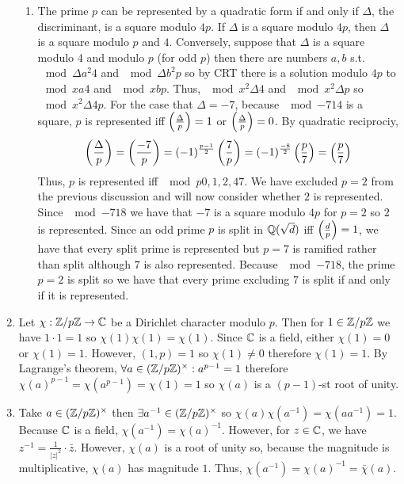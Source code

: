 \documentclass[12pt]{extarticle}
\begin{document}
\begin{enumerate}
\begin{enumerate}
\item The prime $p$ can be represented by a quadratic form if and only if $\Delta$, the discriminant, is a square modulo $4p$. If $\Delta$ is a square modulo $4p$, then $\Delta$ is a square modulo $p$ and $4$. Conversely, suppose that $\Delta$ is a square modulo $4$ and modulo $p$ (for odd $p$) then there are numbers $a,b$ s.t. $\mod{\Delta}{a^2}{4}$ and $\mod{\Delta}{b^2}{p}$ so by CRT there is a solution modulo $4p$ to $\mod{x}{a}{4}$ and $\mod{x}{b}{p}$. Thus, $\mod{x^2}{\Delta}{4}$ and $\mod{x^2}{\Delta}{p}$ so $\mod{x^2}{\Delta}{4p}$. For the case that $\Delta = -7$, because $\mod{-7}{1}{4}$ is a square, $p$ is represented iff $\left(\frac{\Delta}{p} \right) = 1$ or $\left(\frac{\Delta}{p} \right) = 0$. By quadratic reciprociy,
\[\left(\frac{\Delta}{p} \right) = \left(\frac{-7}{p} \right) = (-1)^{\frac{p-1}{2}} \left(\frac{7}{p} \right) =  (-1)^{\frac{-8}{2}} \left(\frac{p}{7} \right) = \left(\frac{p}{7} \right)\]
Thus, $p$ is represented iff $\mod{p}{0,1,2,4}{7}$. We have excluded $p = 2$ from the previous discussion and will now consider whether $2$ is represented. Since $\mod{-7}{1}{8}$ we have that $-7$ is a square modulo $4p$ for $p = 2$ so $2$ is represented. Since an odd prime $p$ is split in $\mathbb{Q} \small(\sqrt{d} \small)$ iff $\left(\frac{d}{p} \right) = 1$, we have that every split prime is represented but $p = 7$ is ramified rather than split although $7$ is also represented. Because $\mod{-7}{1}{8}$, the prime $p = 2$ is split so we have that every prime excluding $7$ is split if and only if it is represented.  

\end{enumerate}

\item Let $\chi : \mathbb{Z} / p \mathbb{Z} \to \mathbb{C}$ be a Dirichlet character modulo $p$. Then for $1 \in \mathbb{Z} /p \mathbb{Z}$ we have $1 \cdot 1 = 1$ so $\chi(1) \chi(1) = \chi(1)$. Since $\mathbb{C}$ is a field, either $\chi(1) = 0$ or $\chi(1) = 1$. However, $(1, p) = 1$ so $\chi(1) \neq 0$ therefore $\chi(1) = 1$. By Lagrange's theorem, $\forall a \in (\mathbb{Z} / p \mathbb{Z})^\times : a^{p-1} = 1$ therefore $\chi(a)^{p-1} = \chi(a^{p-1}) = \chi(1) = 1$ so $\chi(a)$ is a $(p-1)$-st root of unity. 

\item Take $a \in (\mathbb{Z} / p \mathbb{Z})^\times$ then $\exists a^{-1} \in (\mathbb{Z}/ p \mathbb{Z})^\times$ so $\chi(a) \chi(a^{-1}) = \chi(a a^{-1}) = 1$. Because $\mathbb{C}$ is a field, $\chi(a^{-1}) = \chi(a)^{-1}$. However, for $z \in \mathbb{C}$, we have $z^{-1} = \frac{1}{|z|^2} \cdot \bar{z}$. However, $\chi(a)$ is a root of unity so, because the magnitude is multiplicative, $\chi(a)$ has magnitude $1$. Thus, $\chi(a^{-1}) = \chi(a)^{-1} = \bar{\chi}(a)$.  


\end{enumerate}
\end{document}
